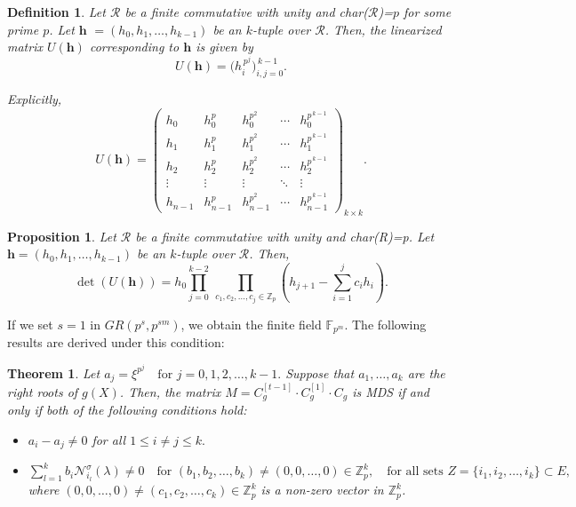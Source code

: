 \documentclass[11pt]{article}
\newtheorem{theorem}{Theorem}
\newtheorem{definition}{Definition}
\newtheorem{proposition}{Proposition}
\begin{document}
\begin{definition}
	Let $\mathcal{R}$ be a finite commutative with unity and char($\mathcal{R}$)=$p$ for some prime $p$. Let $\textbf{h }= (h_0, h_1, \ldots, h_{k-1})$ be an $k$-tuple over $\mathcal{R}$.  
	Then, the linearized matrix $U(\textbf{h})$ corresponding to $\textbf{h}$ is given by
	\[
	U(\textbf{h}) = \bigl(h_i^{\,p^j}\bigr)_{i,j=0}^{\,k-1}.
	\]
    
	Explicitly,
	\[
	U(\textbf{h}) =
	\begin{pmatrix}
		h_0      & h_0^{p}      & h_0^{p^2}      & \cdots & h_0^{p^{\,k-1}} \\
		h_1      & h_1^{p}      & h_1^{p^2}      & \cdots & h_1^{p^{\,k-1}} \\
		h_2      & h_2^{p}      & h_2^{p^2}      & \cdots & h_2^{p^{\,k-1}} \\
		\vdots   & \vdots       & \vdots         & \ddots & \vdots \\
		h_{n-1}  & h_{n-1}^{p}  & h_{n-1}^{p^2}  & \cdots & h_{n-1}^{p^{\,k-1}}
	\end{pmatrix}_{k\times k}.
	\]
\end{definition}

\begin{proposition}\label{kesarwani}\cite[Proposition 1]{Kesarwani2021}
Let $\mathcal{R}$ be a finite commutative with unity and char(R)=p.  	Let $\textbf{h} = (h_0, h_1, \ldots, h_{k-1})$ be an $k$-tuple over $\mathcal{R}$.  Then,
	\[
	\det(U(\textbf{h})) = h_0 \prod_{j=0}^{k-2} \ \prod_{c_1,c_2,\ldots,c_j \in \mathbb{Z}_p} 
	\left( h_{j+1} - \sum_{i=1}^j c_i h_i \right).
	\]
\end{proposition}
If we set $s=1$ in $GR(p^s, p^{sm})$, we obtain the finite field $\mathbb{F}_{p^m}$. The following results are derived under this condition:

 \begin{theorem}
 	Let $a_j = \xi^{p^j} \quad \text{for } j =0,  1,2,\ldots,k-1.$ 
Suppose that $a_1, \dots, a_k$ are the right roots of $g(X)$. 	Then, the matrix 
 	$
 	M = C^{[t-1]}_g \cdot C^{[1]}_g \cdot C_g
 	$
 	is MDS if and only if both of the following conditions hold:
 	\begin{itemize}
 		\item[\textnormal{(i)}] $a_i-a_j\neq 0$ for all $1\leq i\neq j \leq k.$ 
 		\item[\textnormal{(ii)}]
 		\(
 	\sum_{l=1}^{k} b_i \mathcal{N}^\sigma_{i_l}(\lambda) \neq 0 \quad 
 	\text{for } (b_1, b_2, \ldots, b_k) \neq (0,0,\ldots,0) \in \mathbb{Z}_p^{k}, \quad 
 		\text{for all sets } Z = \{i_1, i_2, \ldots, i_k\} \subset E,
 		\)
 		where $(0,0,\ldots,0)\neq(c_1, c_2, \ldots, c_k)\in \mathbb{Z}^k_p $ is a non-zero vector in $\mathbb{Z}_p^k$.
 	\end{itemize}
 \end{theorem}
\end{document}
